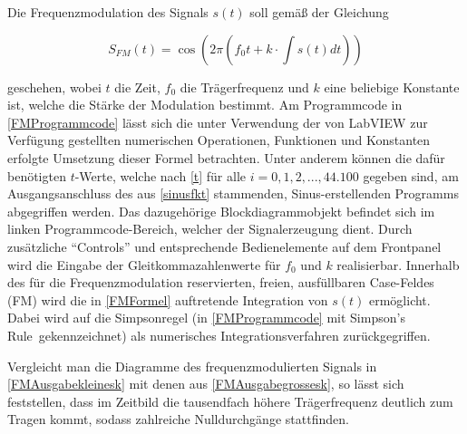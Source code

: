 \documentclass[
a4paper,
12pt,
pagesize,
ngerman
]{scrartcl}
\begin{document}
	Die Frequenzmodulation des Signals $s(t)$ soll gemäß der Gleichung
	
	\begin{equation} \label{FMFormel}
	S_{FM}(t) = \cos (2\pi (f_0 t + k \cdot \int s(t) dt))
	\end{equation}
	
	\noindent geschehen, wobei $t$ die Zeit, $f_0$ die Trägerfrequenz und $k$ eine beliebige Konstante ist, welche die Stärke der Modulation bestimmt. 
	Am Programmcode in \cref{FMProgrammcode} lässt sich die unter Verwendung der von LabVIEW zur Verfügung gestellten numerischen Operationen, Funktionen und Konstanten erfolgte Umsetzung dieser Formel betrachten. 
	Unter anderem können die dafür benötigten $t$-Werte, welche nach \cref{t} für alle $i = 0,1,2,...,44.100$ gegeben sind, am Ausgangsanschluss des aus \cref{sinusfkt} stammenden, Sinus-erstellenden Programms abgegriffen werden. 
	Das dazugehörige Blockdiagrammobjekt befindet sich im linken Programmcode-Bereich, welcher der Signalerzeugung dient. 
	Durch zusätzliche \enquote{Controls} und entsprechende Bedienelemente auf dem Frontpanel wird die Eingabe der Gleitkommazahlenwerte für $f_0$ und $k$ realisierbar. 
	Innerhalb des für die Frequenzmodulation reservierten, freien, ausfüllbaren Case-Feldes (\glqq FM\grqq ) wird die in \cref{FMFormel} auftretende Integration von $s(t)$ ermöglicht.
	Dabei wird auf die Simpsonregel (in \cref{FMProgrammcode} mit \glqq Simpson's Rule\grqq\ gekennzeichnet) als numerisches Integrationsverfahren zurückgegriffen.
	
	Vergleicht man die Diagramme des frequenzmodulierten Signals in \cref{FMAusgabekleinesk} mit denen aus \cref{FMAusgabegrossesk}, so lässt sich feststellen, dass im Zeitbild die tausendfach höhere Trägerfrequenz deutlich zum Tragen kommt, sodass zahlreiche Nulldurchgänge stattfinden. 
	
\end{document}

